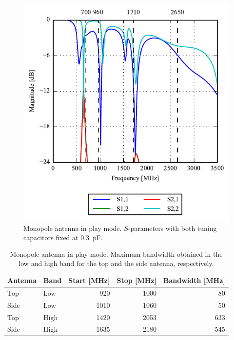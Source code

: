 \begin{figure}[htbp]
    \centering
    \includegraphics{img/tech_sol/monopole/play_mode/sparams_play.pdf}
    \caption{Monopole antenna in play mode. $S$-parameters with both tuning capacitors fixed at \SI{0.3}{pF}.}
    \label{fig:mono_play_sparam_data}
\end{figure}

\begin{table}[htbp]
    \centering
    \begin{tabular}{|l|l|r|r|r|}
      \hline
      Antenna & Band & Start [MHz] & Stop [MHz] & Bandwidth [MHz] \\
      \hline
      Top     & Low  & 920 & 1000 &  80 \\
      Side    & Low  & 1010 & 1060 & 50 \\
      \hline
      Top     & High & 1420 & 2053 & 633 \\
      Side    & High & 1635 & 2180 & 545 \\
      \hline
    \end{tabular}
    \caption{Monopole antenna in play mode. Maximum bandwidth obtained in the low and high band for the top and the side antenna, respectively.}    
    \label{tab:bw_sol1play}
  \end{table}

